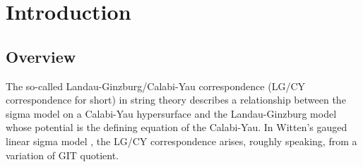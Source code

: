 \documentclass[11pt]{amsart}
\theoremstyle{definition} %
\theoremstyle{remark} %
\begin{document}
\renewcommand{\tocsection}[2]{\hspace{0em}\oldtocsection{#1}{#2}}
\renewcommand{\tocsubsection}[2]{\hspace{1em}\oldtocsubsection{#1}{#2}}
{
\tableofcontents
} 

\section{Introduction}
\label{sect:intro}

\subsection{Overview} 
\label{subsec:overview} 

The so-called Landau-Ginzburg/Calabi-Yau correspondence 
(LG/CY correspondence for short) in string 
theory \cite{Martinec, Vafa-Warner, Greene-Vafa-Warner} 
describes a relationship between the sigma model on a 
Calabi-Yau hypersurface and the Landau-Ginzburg model 
whose potential is the defining equation of the Calabi-Yau. 
In Witten's gauged linear sigma model \cite{Witten:phases}, 
the LG/CY correspondence arises, roughly speaking, from 
a variation of GIT quotient.  
\end{document}
